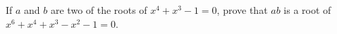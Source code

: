 If $ a$ and $ b$ are two of the roots of $ x^4+x^3-1=0$,  prove that $ ab$ is a root of $ x^6+x^4+x^3-x^2-1=0$.